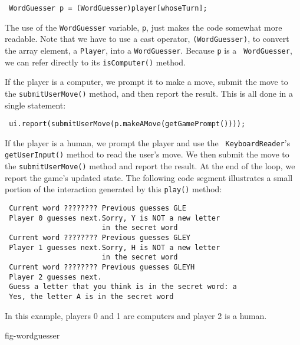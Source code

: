 \begin{jjjlisting}
\begin{lstlisting}
 WordGuesser p = (WordGuesser)player[whoseTurn];
\end{lstlisting}
\end{jjjlisting}

\noindent The use of the {\tt WordGuesser} variable, {\tt p},  
just makes the code somewhat more readable. Note that we have to use
a cast operator, {\tt (WordGuesser)}, to convert the array element, a
{\tt Player}, into a {\tt WordGuesser}.  Because {\tt p} is a {\tt
WordGuesser}, we can refer directly to its {\tt isComputer()} method. 

If the player is a computer, we prompt it to make a move, submit
the move to the {\tt submitUserMove()} method, and then report the
result.  This is all done in a single statement:

\begin{jjjlisting}
\begin{lstlisting}
 ui.report(submitUserMove(p.makeAMove(getGamePrompt())));
\end{lstlisting}
\end{jjjlisting}

\noindent If the player is a human, we prompt the player and use the {\tt
KeyboardReader}'s {\tt getUserInput()} method to read the user's move.
We then submit the move to the {\tt submitUserMove()} method and
report the result.  At the end of the loop, we report the game's
updated state. The following code segment illustrates a small portion
of the interaction generated by this {\tt play()} method:

\begin{jjjlisting}
\begin{lstlisting}
 Current word ???????? Previous guesses GLE
 Player 0 guesses next.Sorry, Y is NOT a new letter 
                       in the secret word
 Current word ???????? Previous guesses GLEY
 Player 1 guesses next.Sorry, H is NOT a new letter 
                       in the secret word
 Current word ???????? Previous guesses GLEYH
 Player 2 guesses next.
 Guess a letter that you think is in the secret word: a
 Yes, the letter A is in the secret word
\end{lstlisting}
\end{jjjlisting}

\noindent In this example, players 0 and 1 are computers and player 2 is
a human. 

{fig-wordguesser}

